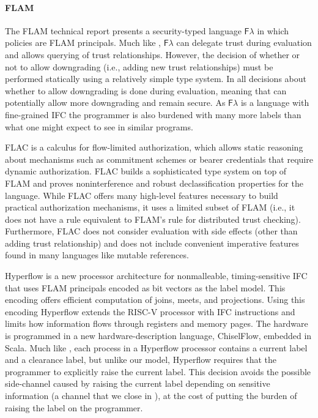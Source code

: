 \paragraph{FLAM}
The FLAM technical report \cite{flamtr} presents a security-typed language $\mathsf{F}\lambda$ in which policies are FLAM principals. Much like \lang{}, $\mathsf{F}\lambda$ can delegate trust during evaluation and allows querying of trust relationships. However, the decision of whether or not to allow downgrading (i.e., adding new trust relationships) must be performed statically using a relatively simple type system. In \lang{} all decisions about whether to allow downgrading is done during evaluation, meaning that \lang{} can potentially allow more downgrading and remain secure. As $\mathsf{F}\lambda$ is a language with fine-grained IFC the programmer is also burdened with many more labels than what one might expect to see in similar \lang{} programs.

FLAC \cite{7536372} is a calculus for flow-limited authorization, which allows static reasoning about mechanisms such as commitment schemes or bearer credentials that require dynamic authorization. FLAC builds a sophisticated type system on top of FLAM and proves noninterference and robust declassification properties for the language. While FLAC offers many high-level features necessary to build practical authorization mechanisms, it uses a limited subset of FLAM (i.e., it does not have a rule equivalent to FLAM's  rule for distributed trust checking). Furthermore, FLAC does not consider evaluation with side effects (other than adding trust relationship) and does not include convenient imperative features found in many languages like mutable references.

Hyperflow \cite{hyperflow} is a new processor architecture for nonmalleable, timing-sensitive IFC that uses FLAM principals encoded as bit vectors as the label model. This encoding offers efficient computation of joins, meets, and projections. Using this encoding Hyperflow extends the RISC-V processor with IFC instructions and limits how information flows through registers and memory pages. The hardware is programmed in a new hardware-description language, ChiselFlow, embedded in Scala. Much like \lang{}, each process in a Hyperflow processor contains a current label and a clearance label, but unlike our model, Hyperflow requires that the programmer to explicitly raise the current label. This decision avoids the possible side-channel caused by raising the current label depending on sensitive information (a channel that we close in \lang), at the cost of putting the burden of raising the label on the programmer.

